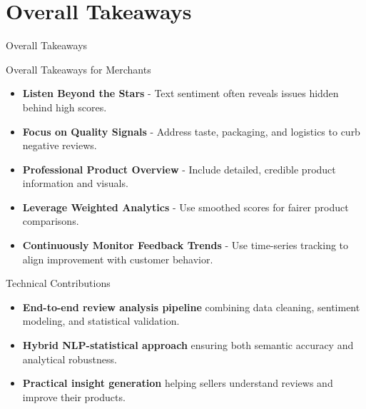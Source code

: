 \documentclass[serif, aspectratio=169]{beamer}
\begin{document}












\section{Overall Takeaways}


\begin{frame}{Overall Takeaways}
    \footnotesize

    \begin{block}{Overall Takeaways for Merchants}
		\begin{itemize}
			\item \textbf{Listen Beyond the Stars} - Text sentiment often reveals issues hidden behind high scores.
            \item \textbf{Focus on Quality Signals} - Address taste, packaging, and logistics to curb negative reviews.
            \item \textbf{Professional Product Overview} - Include detailed, credible product information and visuals.
            \item \textbf{Leverage Weighted Analytics} - Use smoothed scores for fairer product comparisons.
            \item \textbf{Continuously Monitor Feedback Trends} - Use time-series tracking to align improvement with customer behavior.
		\end{itemize}
	\end{block}
    
	\begin{block}{Technical Contributions}
		\begin{itemize}
            \item \textbf{End-to-end review analysis pipeline} combining data cleaning, sentiment modeling, and statistical validation.
            \item \textbf{Hybrid NLP-statistical approach} ensuring both semantic accuracy and analytical robustness.
            \item \textbf{Practical insight generation} helping sellers understand reviews and improve their products.
		\end{itemize}
	\end{block}
\end{frame}
\end{document}
